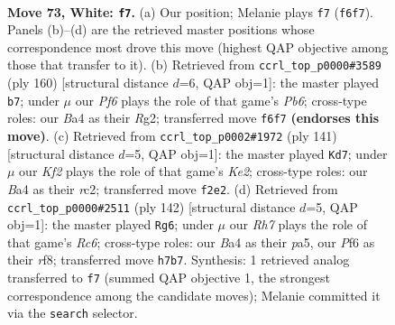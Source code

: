 \documentclass[11pt]{article}
\begin{document}
\clearpage

\begin{figure}[p]\centering
\begin{subfigure}{0.46\textwidth}\centering
\resizebox{\linewidth}{!}{%
\newchessgame
\chessboard[
  setfen={8/7R/5P2/2k5/B7/8/5K1P/8 w - - 3 73},
  showmover=false,
  pgfstyle=straightmove, color=movearrow, markmove={f6-f7}
]}
\caption{}
\end{subfigure}\hfill
\begin{subfigure}{0.46\textwidth}\centering
\resizebox{\linewidth}{!}{%
\newchessgame
\chessboard[
  setfen={8/5k2/1P6/8/8/P7/2K3R1/8 w - - 0 81},
  showmover=false,
  pgfstyle=straightmove, color=movearrow, markmove={b6-b7}
]}
\caption{}
\end{subfigure}
\\[4pt]
\begin{subfigure}{0.46\textwidth}\centering
\resizebox{\linewidth}{!}{%
\newchessgame
\chessboard[
  setfen={8/4k3/8/p3K3/8/4P3/2R5/r7 b - - 2 71},
  showmover=false,
  pgfstyle=straightmove, color=movearrow, markmove={e7-d7}
]}
\caption{}
\end{subfigure}\hfill
\begin{subfigure}{0.46\textwidth}\centering
\resizebox{\linewidth}{!}{%
\newchessgame
\chessboard[
  setfen={5r2/k7/2R5/p7/8/8/K1P5/8 w - - 16 72},
  showmover=false,
  pgfstyle=straightmove, color=movearrow, markmove={c6-g6}
]}
\caption{}
\end{subfigure}
\caption{\textbf{Move 73, White: \texttt{f7}.} (a) Our position; Melanie plays \texttt{f7} (\texttt{f6f7}). Panels (b)--(d) are the retrieved master positions whose correspondence most drove this move (highest QAP objective among those that transfer to it). (b) Retrieved from \texttt{ccrl\_top\_p0000\#3589} (ply 160) [structural distance $d$=6, QAP obj=1]: the master played \texttt{b7}; under $\mu$ our \emph{Pf6} plays the role of that game's \emph{Pb6}; cross-type roles: our \emph{B}a4 as their \emph{R}g2; transferred move \texttt{f6f7} \textbf{(endorses this move)}. (c) Retrieved from \texttt{ccrl\_top\_p0002\#1972} (ply 141) [structural distance $d$=5, QAP obj=1]: the master played \texttt{Kd7}; under $\mu$ our \emph{Kf2} plays the role of that game's \emph{Ke2}; cross-type roles: our \emph{B}a4 as their \emph{r}c2; transferred move \texttt{f2e2}. (d) Retrieved from \texttt{ccrl\_top\_p0000\#2511} (ply 142) [structural distance $d$=5, QAP obj=1]: the master played \texttt{Rg6}; under $\mu$ our \emph{Rh7} plays the role of that game's \emph{Rc6}; cross-type roles: our \emph{B}a4 as their \emph{p}a5, our \emph{P}f6 as their \emph{r}f8; transferred move \texttt{h7b7}. Synthesis: 1 retrieved analog transferred to \texttt{f7} (summed QAP objective 1, the strongest correspondence among the candidate moves); Melanie committed it via the \texttt{search} selector.}
\label{fig:thought-m144}
\end{figure}
\end{document}
